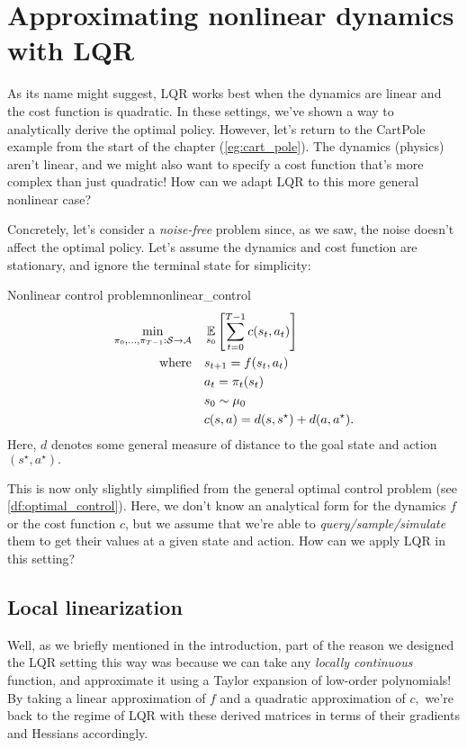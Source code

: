 \documentclass[../main/main]{subfiles}
\begin{document}
\section{Approximating nonlinear dynamics with LQR}

As its name might suggest, LQR works best when the dynamics are linear and the cost function is quadratic. In these settings, we've shown a way to analytically derive the optimal policy.
However, let's return to the CartPole example from the start of the chapter (\autoref{eg:cart_pole}). The dynamics (physics) aren't linear, and we might also want to specify a cost function that's more complex than just quadratic! How can we adapt LQR to this more general nonlinear case?

Concretely, let's consider a \emph{noise-free} problem since, as we saw, the noise doesn't affect the optimal policy. Let's assume the dynamics and cost function are stationary, and ignore the terminal state for simplicity:

\begin{definition}{Nonlinear control problem}{nonlinear_control}
\begin{align*}
    \min_{\pi_0, \dots, \pi_{T-1} : \mathcal{S} \to \mathcal{A}} \quad & \operatorname*{\mathbb{E}}_{s_0} \left[ \sum_{t=0}^{T-1} c(s_t, a_t) \right] \\
    \text{where} \quad & s_{t+1} = f(s_t, a_t) \\
    & a_t = \pi_t(s_t) \\
    & s_0 \sim \mu_0 \\
    & c(s, a) = d(s, s^\star) + d(a, a^\star).
\end{align*}
Here, $d$ denotes some general measure of distance to the goal state and action $(s^\star, a^\star).$
\end{definition}

This is now only slightly simplified from the general optimal control problem (see \ref{df:optimal_control}). Here, we don't know an analytical form for the dynamics $f$ or the cost function $c$,
but we assume that we're able to \emph{query/sample/simulate} them
to get their values at a given state and action.
How can we apply LQR in this setting?

\subsection{Local linearization}

Well, as we briefly mentioned in the introduction, part of the reason we designed the LQR setting this way was because we can take any \emph{locally continuous} function, and approximate it using a Taylor expansion of low-order polynomials! By taking a linear approximation of $f$ and a quadratic approximation of $c,$ we're back to the regime of LQR with these derived matrices in terms of their gradients and Hessians accordingly.
\end{document}
